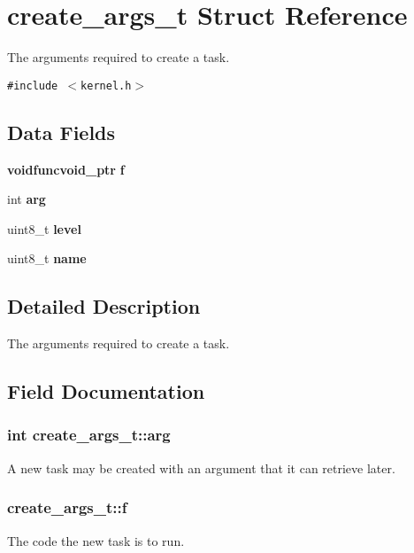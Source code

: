\section{create\_\-args\_\-t Struct Reference}
\label{structcreate__args__t}
The arguments required to create a task.  


{\tt \#include $<$kernel.h$>$}

\subsection*{Data Fields}
\begin{CompactItemize}
\item 
{\bf voidfuncvoid\_\-ptr} {\bf f}
\item 
int {\bf arg}
\item 
uint8\_\-t {\bf level}
\item 
uint8\_\-t {\bf name}
\end{CompactItemize}


\subsection{Detailed Description}
The arguments required to create a task. 



\subsection{Field Documentation}
\subsubsection{\setlength{\rightskip}{0pt plus 5cm}int {\bf create\_\-args\_\-t::arg}}\label{structcreate__args__t_d31b4b2358ca1aff8fc2457628330ae7}


A new task may be created with an argument that it can retrieve later. 
\subsubsection{ {\bf create\_\-args\_\-t::f}}\label{structcreate__args__t_972618840a815fc7c7b0a0107e65e625}


The code the new task is to run. 
